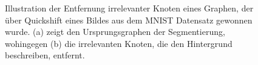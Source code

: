 \begin{figure}[t]
\centering
{}
\hspace{1cm}
\caption[Entfernung irrelevanter Knoten]{Illustration der Entfernung irrelevanter Knoten eines Graphen, der über Quickshift eines Bildes aus dem \gls{MNIST} Datensatz gewonnen wurde.
(a) zeigt den Ursprungsgraphen der Segmentierung, wohingegen (b) die irrelevanten Knoten, die den Hintergrund beschreiben, entfernt.}
\label{fig:knotenentfernung}
\end{figure}
